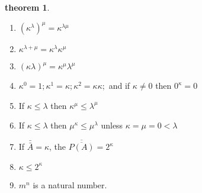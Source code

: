 \documentclass[a4paper,11pt]{article}%
\theoremstyle{remark}
\theoremstyle{definition}
\newtheorem{theorem}{theorem}[section]
\theoremstyle{definition}
\theoremstyle{plain}
\theoremstyle{definition}
\begin{document}
\begin{theorem}
    \begin{enumerate}
        \item $(\kappa^{\lambda})^{\mu}=\kappa^{\lambda\mu}$
        \item $\kappa^{\lambda+\mu}=\kappa^{\lambda}\kappa^{\mu}$
        \item $(\kappa\lambda)^{\mu}=\kappa^{\mu}\lambda^{\mu}$
        \item $\kappa^0=1;\kappa^1=\kappa;\kappa^2=\kappa\kappa;$ and if $\kappa\neq 0$ then $0^{\kappa}=0$
        \item If $\kappa\leq\lambda$ then $\kappa^{\mu}\leq\lambda^{\mu}$
        \item If $\kappa\leq\lambda$ then $\mu^{\kappa}\leq \mu^{\lambda}$ unless $\kappa=\mu=0<\lambda$
        \item If $\bar{\bar{A}}=\kappa$, the $\overline{\overline{P(A)}}=2^{\kappa}$
        \item $\kappa\leq 2^{\kappa}$
        \item $m^n$ is a natural number.
    \end{enumerate}
\end{theorem}
\end{document}
